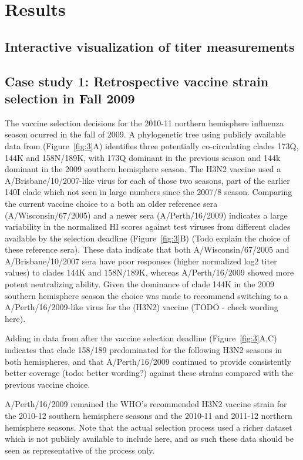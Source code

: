 \documentclass[utf8]{FrontiersinHarvard} %
\begin{document}
\section{Results}

\subsection{Interactive visualization of titer measurements}

\subsection{Case study 1: Retrospective vaccine strain selection in Fall 2009}

The vaccine selection decisions for the 2010-11 northern hemisphere influenza season ocurred in the fall of 2009.
A phylogenetic tree using publicly available data from \citep{Bedford:2014bf} (Figure~\ref{fig:3}A) identifies three potentially co-circulating clades 173Q, 144K and 158N/189K, with 173Q dominant in the previous season and 144k dominant in the 2009 southern hemisphere season.
The H3N2 vaccine used a A/Brisbane/10/2007-like virus for each of those two seasons, part of the earlier 140I clade which not seen in large numbers since the 2007/8 season.
Comparing the current vaccine choice to a both an older reference sera (A/Wisconsin/67/2005) and a newer sera (A/Perth/16/2009) indicates a large variability in the normalized HI scores against test viruses from different clades available by the selection deadline (Figure~\ref{fig:3}B) (Todo explain the choice of these reference sera).
These data indicate that both A/Wisconsin/67/2005 and A/Brisbane/10/2007 sera have poor responses (higher normalized log2 titer values) to clades 144K and 158N/189K, whereas A/Perth/16/2009 showed more potent neutralizing ability.
Given the dominance of clade 144K in the 2009 southern hemisphere season the choice was made to recommend switching to a A/Perth/16/2009-like virus for the (H3N2) vaccine (TODO - check wording here).


Adding in data from after the vaccine selection deadline (Figure~\ref{fig:3}A,C) indicates that clade 158/189 predominated for the following H3N2 seasons in both hemispheres, and that A/Perth/16/2009 continued to provide consistently better coverage (todo: better wording?) against these strains compared with the previous vaccine choice. 


A/Perth/16/2009 remained the WHO's recommended H3N2 vaccine strain for the 2010-12 southern hemisphere seasons and the 2010-11 and 2011-12 northern hemisphere seasons. Note that the actual selection process used a richer dataset which is not publicly available to include here, and as such these data should be seen as representative of the process only.
\end{document}
